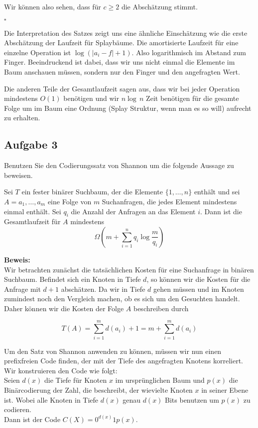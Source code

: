\documentclass[11pt,a4paper,ngerman]{article}
\begin{document}
Wir können also sehen, dass für $c \geq 2$ die Abschätzung stimmt.

\mbox{}\hfill$\square$

Die Interpretation des Satzes zeigt uns eine ähnliche Einschätzung wie die erste Abschätzung der Laufzeit für Splaybäume. 
Die amortisierte Laufzeit für eine einzelne Operation ist $\log (|a_i - f| + 1)$. Also logarithmisch im Abstand zum Finger. Beeindruckend ist dabei,
dass wir uns nicht einmal die Elemente im Baum anschauen müssen, sondern nur den Finger und den angefragten Wert.

Die anderen Teile der Gesamtlaufzeit sagen aus, dass wir bei jeder Operation mindestens $O(1)$ benötigen und wir $n \log \, n$ Zeit
benötigen für die gesamte Folge um im Baum eine Ordnung (Splay Struktur, wenn man es so will) aufrecht zu erhalten.

\subsection*{Aufgabe 3}
Benutzen Sie den Codierungssatz von Shannon um die folgende Aussage zu beweisen.

Sei $T$ ein fester binärer Suchbaum, der die Elemente $\{1,\ldots,n\}$ enthält und sei $A=a_1,\ldots,a_m$ eine Folge von $m$ Suchanfragen, die jedes Element mindestens einmal enthält. Sei $q_i$ die Anzahl der Anfragen an das Element $i$. Dann ist die Gesamtlaufzeit für $A$ mindestens
$$
   \Omega\left(m + \sum_{i=1}^n q_i \log \frac{m}{q_i}\right)
$$

\noindent\textbf{Beweis:}\\

Wir betrachten zunächst die tatsächlichen Kosten für eine Suchanfrage in binären Suchbaum. Befindet sich ein Knoten in Tiefe $d$, so können wir
die Kosten für die Anfrage mit $d+1$ abschätzen. Da wir in Tiefe $d$ gehen müssen und im Knoten zumindest noch den Vergleich machen, ob es sich um den Gesuchten handelt. Daher können wir die Kosten der Folge $A$ beschreiben durch

$$
	T(A) = \sum_{i=1}^m d(a_i) + 1 = m + \sum_{i=1}^m d(a_i)
$$

Um den Satz von Shannon anwenden zu können, müssen wir nun einen prefixfreien Code finden, der mit der Tiefe des angefragten Knotens
korreliert. Wir konstruieren den Code wie folgt:\\

Seien $d(x)$ die Tiefe für Knoten $x$ im ursprünglichen Baum und $p(x)$ die Binärcodierung der Zahl, die beschreibt, der wievielte Knoten $x$ in seiner Ebene ist. Wobei alle Knoten in Tiefe $d(x)$ genau $d(x)$ Bits benutzen um $p(x)$ zu codieren.\\
Dann ist der Code $C(X) = 0^{d(x)}1p(x)$.
\end{document}
